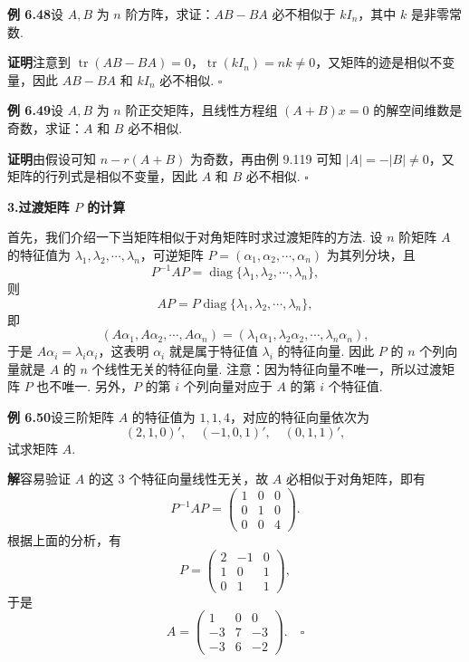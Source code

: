 \documentclass[UTF8,12pt,a4paper,fontset=fandol]{ctexart}
\begin{document}
\noindent\textbf{例 6.48}\quad 设 $A,B$ 为 $n$ 阶方阵，求证：$AB-BA$ 必不相似于 $kI_n$，其中 $k$ 是非零常数.

\noindent\textbf{证明}\quad 注意到 $\operatorname{tr}(AB-BA)=0$，$\operatorname{tr}(kI_n)=nk\ne 0$，又矩阵的迹是相似不变量，因此 $AB-BA$ 和 $kI_n$ 必不相似. $\square$

\noindent\textbf{例 6.49}\quad 设 $A,B$ 为 $n$ 阶正交矩阵，且线性方程组 $(A+B)x=0$ 的解空间维数是奇数，求证：$A$ 和 $B$ 必不相似.

\noindent\textbf{证明}\quad 由假设可知 $n-r(A+B)$ 为奇数，再由例 9.119 可知 $|A|=-|B|\ne 0$，又矩阵的行列式是相似不变量，因此 $A$ 和 $B$ 必不相似. $\square$

\noindent\textbf{3.\quad 过渡矩阵 $P$ 的计算}

首先，我们介绍一下当矩阵相似于对角矩阵时求过渡矩阵的方法. 设 $n$ 阶矩阵 $A$ 的特征值为 $\lambda_1,\lambda_2,\cdots,\lambda_n$，可逆矩阵 $P=(\alpha_1,\alpha_2,\cdots,\alpha_n)$ 为其列分块，且
\[
P^{-1}AP=\operatorname{diag}\{\lambda_1,\lambda_2,\cdots,\lambda_n\},
\]
则
\[
AP=P\operatorname{diag}\{\lambda_1,\lambda_2,\cdots,\lambda_n\},
\]
即
\[
(A\alpha_1,A\alpha_2,\cdots,A\alpha_n)=(\lambda_1\alpha_1,\lambda_2\alpha_2,\cdots,\lambda_n\alpha_n),
\]
于是 $A\alpha_i=\lambda_i\alpha_i$，这表明 $\alpha_i$ 就是属于特征值 $\lambda_i$ 的特征向量. 因此 $P$ 的 $n$ 个列向量就是 $A$ 的 $n$ 个线性无关的特征向量. 注意：因为特征向量不唯一，所以过渡矩阵 $P$ 也不唯一. 另外，$P$ 的第 $i$ 个列向量对应于 $A$ 的第 $i$ 个特征值.

\noindent\textbf{例 6.50}\quad 设三阶矩阵 $A$ 的特征值为 $1,1,4$，对应的特征向量依次为
\[
(2,1,0)',\quad (-1,0,1)',\quad (0,1,1)',
\]
试求矩阵 $A$.

\noindent\textbf{解}\quad 容易验证 $A$ 的这 3 个特征向量线性无关，故 $A$ 必相似于对角矩阵，即有
\[
P^{-1}AP=\left(\begin{array}{ccc}
1 & 0 & 0\\
0 & 1 & 0\\
0 & 0 & 4
\end{array}\right).
\]
根据上面的分析，有
\[
P=\left(\begin{array}{ccc}
2 & -1 & 0\\
1 & 0 & 1\\
0 & 1 & 1
\end{array}\right),
\]
于是
\[
A=\left(\begin{array}{ccc}
1 & 0 & 0\\
-3 & 7 & -3\\
-3 & 6 & -2
\end{array}\right). \quad \square
\]
\end{document}
